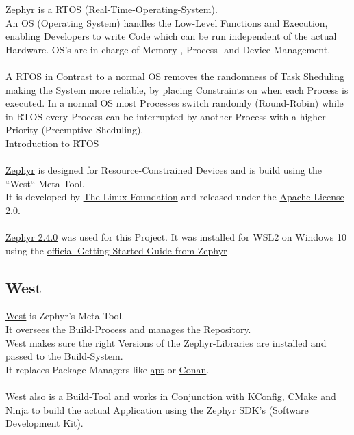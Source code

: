 \href{https://zephyrproject.org/}
{Zephyr} is a RTOS (Real-Time-Operating-System).
\\
An OS (Operating System) handles the Low-Level Functions and Execution, enabling
Developers to write Code which can be run independent of the actual Hardware.
OS's are in charge of Memory-, Process- and Device-Management.
\\
\\
A RTOS in Contrast to a normal OS removes the randomness of Task Sheduling
making the System more reliable, by placing Constraints on when each Process
is executed. In a normal OS most Processes switch randomly (Round-Robin) while in RTOS
every Process can be interrupted by another Process with a higher Priority (Preemptive Sheduling).
\\
\href{https://predictabledesigns.com/introduction-to-real-time-operating-systems-rtos-for-use-in-embedded-systems/}
{Introduction to RTOS}
\\
\\
\href{https://zephyrproject.org/}{Zephyr} is designed for Resource-Constrained
Devices and is build using the ``West``-Meta-Tool.
\\
It is developed by
\href{https://www.linuxfoundation.org/}
{The Linux Foundation} and released under the
\href{https://www.apache.org/licenses/LICENSE-2.0.html}
{Apache License 2.0}.
\\
\\
\href{https://docs.zephyrproject.org/2.4.0/index.html}
{Zephyr 2.4.0} was used for this Project.
It was installed for WSL2 on Windows 10 using the
\href{https://docs.zephyrproject.org/2.4.0/getting_started/index.html}
{official Getting-Started-Guide from Zephyr}

\subsection{West}

\href{https://docs.zephyrproject.org/2.4.0/guides/west/index.html}
{West} is Zephyr's Meta-Tool.
\\
It oversees the Build-Process and manages the Repository.
\\
West makes sure the right Versions of the Zephyr-Libraries are installed and
passed to the Build-System.
\\
It replaces Package-Managers like
\href{https://en.wikipedia.org/wiki/APT_(software)}{apt}
or
\href{https://conan.io/}{Conan}.
\\
\\
West also is a Build-Tool and works in Conjunction with KConfig, CMake and Ninja
to build the actual Application using the Zephyr SDK's (Software Development Kit).

